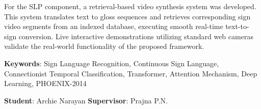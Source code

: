 For the SLP component, a retrieval-based video synthesis system was developed. This system translates text to gloss sequences and retrieves corresponding sign video segments from an indexed database, executing smooth real-time text-to-sign conversion. Live interactive demonstrations utilizing standard web cameras validate the real-world functionality of the proposed framework.

\vspace{1cm}
\noindent \textbf{Keywords}: Sign Language Recognition, Continuous Sign Language, Connectionist Temporal Classification, Transformer, Attention Mechanism, Deep Learning, PHOENIX-2014

\vspace{2cm}

\noindent \textbf{Student}: Archie Narayan \hfill \textbf{Supervisor}: Prajna P.N.
\clearpage
